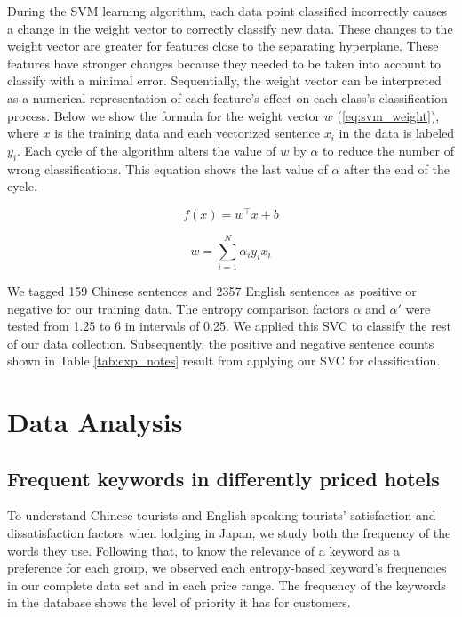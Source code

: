 \documentclass[smallextended,natbib]{svjour3}       %
\begin{document}
    During the SVM learning algorithm, each data point classified incorrectly causes a change in the weight vector to correctly classify new data. These changes to the weight vector are greater for features close to the separating hyperplane. These features have stronger changes because they needed to be taken into account to classify with a minimal error. Sequentially, the weight vector can be interpreted as a numerical representation of each feature's effect on each class's classification process. Below we show the formula for the weight vector \(w\) (\ref{eq:svm_weight}), where \(x\) is the training data and each vectorized sentence \(x_i\) in the data is labeled \(y_i\). Each cycle of the algorithm alters the value of \(w\) by \(\alpha\) to reduce the number of wrong classifications. This equation shows the last value of \(\alpha\) after the end of the cycle.

    \begin{equation}\label{eq:svm1}
    f(x) = w^\top x + b
    \end{equation}

    \begin{equation}\label{eq:svm_weight}
    w = \sum_{i=1}^N \alpha_i y_i x_i
    \end{equation}

    We tagged 159 Chinese sentences and \num[group-separator={,}]{2357} English sentences as positive or negative for our training data. The entropy comparison factors \(\alpha\) and \(\alpha'\) were tested from 1.25 to 6 in intervals of 0.25. We applied this SVC to classify the rest of our data collection. Subsequently, the positive and negative sentence counts shown in Table \ref{tab:exp_notes} result from applying our SVC for classification.

\section{Data Analysis}\label{dataanalysis}

  \subsection{Frequent keywords in differently priced hotels}\label{svmresults}

    To understand Chinese tourists and English-speaking tourists' satisfaction and dissatisfaction factors when lodging in Japan, we study both the frequency of the words they use. Following that, to know the relevance of a keyword as a preference for each group, we observed each entropy-based keyword's frequencies in our complete data set and in each price range. The frequency of the keywords in the database shows the level of priority it has for customers.
\end{document}
